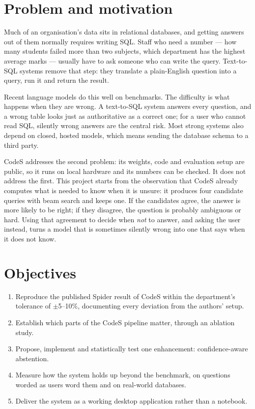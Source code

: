 \section{Problem and motivation}

Much of an organisation's data sits in relational databases, and getting answers out of them normally requires writing SQL. Staff who need a number --- how many students failed more than two subjects, which department has the highest average marks --- usually have to ask someone who can write the query. Text-to-SQL systems remove that step: they translate a plain-English question into a query, run it and return the result.

Recent language models do this well on benchmarks. The difficulty is what happens when they are wrong. A text-to-SQL system answers every question, and a wrong table looks just as authoritative as a correct one; for a user who cannot read SQL, silently wrong answers are the central risk. Most strong systems also depend on closed, hosted models, which means sending the database schema to a third party.

CodeS \cite{li2024codes} addresses the second problem: its weights, code and evaluation setup are public, so it runs on local hardware and its numbers can be checked. It does not address the first. This project starts from the observation that CodeS already computes what is needed to know when it is unsure: it produces four candidate queries with beam search and keeps one. If the candidates agree, the answer is more likely to be right; if they disagree, the question is probably ambiguous or hard. Using that agreement to decide when \emph{not} to answer, and asking the user instead, turns a model that is sometimes silently wrong into one that says when it does not know.

\section{Objectives}

\begin{enumerate}
	\item Reproduce the published Spider result of CodeS within the department's tolerance of $\pm$5--10\%, documenting every deviation from the authors' setup.
	\item Establish which parts of the CodeS pipeline matter, through an ablation study.
	\item Propose, implement and statistically test one enhancement: confidence-aware abstention.
	\item Measure how the system holds up beyond the benchmark, on questions worded as users word them and on real-world databases.
	\item Deliver the system as a working desktop application rather than a notebook.
\end{enumerate}


